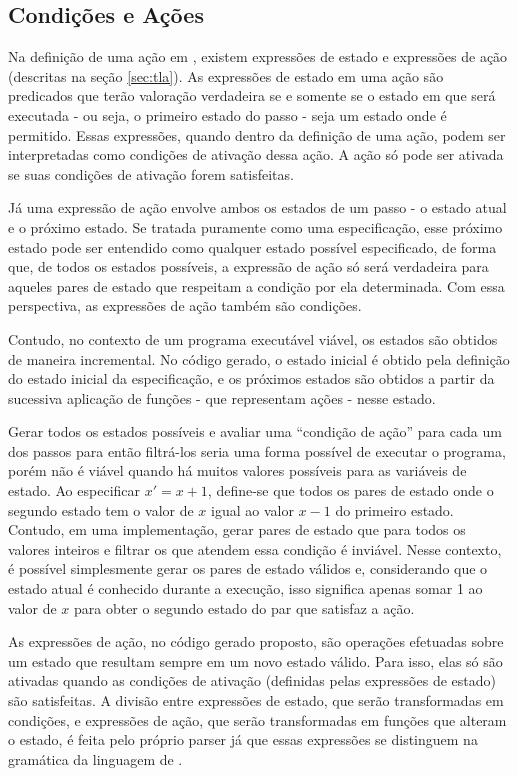 \subsection{Condições e Ações}
\label{sec:condicoes}

Na definição de uma ação em \TLAA, existem expressões de estado e expressões de
ação (descritas na seção \ref{sec:tla}). As expressões de estado em uma ação
\FANCYA são predicados que terão valoração verdadeira se e somente se o estado em que \FANCYA
será executada - ou seja, o primeiro estado do passo - seja um estado onde
\FANCYA é permitido. Essas expressões, quando dentro da definição de uma ação,
podem ser interpretadas como condições de ativação dessa ação. A ação só pode ser ativada
se suas condições de ativação forem satisfeitas.

Já uma expressão de ação envolve ambos os estados de um passo - o estado atual e
o próximo estado. Se tratada puramente como uma especificação, esse próximo
estado pode ser entendido como qualquer estado possível especificado, de forma
que, de todos os estados possíveis, a expressão de ação só será verdadeira para
aqueles pares de estado que respeitam a condição por ela determinada. Com essa
perspectiva, as expressões de ação também são condições.

Contudo, no contexto de um programa executável viável, os estados são obtidos de
maneira incremental. No código gerado, o estado inicial é obtido pela definição
do estado inicial da especificação, e os próximos estados são obtidos a partir
da sucessiva aplicação de funções - que representam ações - nesse estado.

Gerar todos os estados possíveis e avaliar uma ``condição de ação'' para cada um dos
passos para então filtrá-los seria uma forma possível de executar o programa, porém
não é viável quando há muitos valores possíveis para as variáveis de estado. Ao
especificar $x' = x + 1$, define-se que todos os pares de estado onde o segundo estado tem o
valor de $x$ igual ao valor $x - 1$ do primeiro estado. Contudo, em uma
implementação, gerar pares de estado que para todos os valores
inteiros e filtrar os que atendem essa condição é
inviável. Nesse contexto, é possível simplesmente gerar os pares de estado válidos e,
considerando que o estado atual é conhecido durante a execução, isso significa apenas
somar 1 ao valor de $x$ para obter o segundo estado do par que satisfaz a ação.

As expressões de ação, no código gerado proposto, são operações efetuadas sobre
um estado que resultam sempre em um novo estado válido. Para isso, elas só são
ativadas quando as condições de ativação (definidas pelas expressões
de estado) são satisfeitas. A divisão
entre expressões de estado, que serão transformadas em condições, e expressões de
ação, que serão transformadas em funções que alteram o estado, é feita pelo
próprio parser já que essas expressões se distinguem na gramática da linguagem
de \TLAA.

